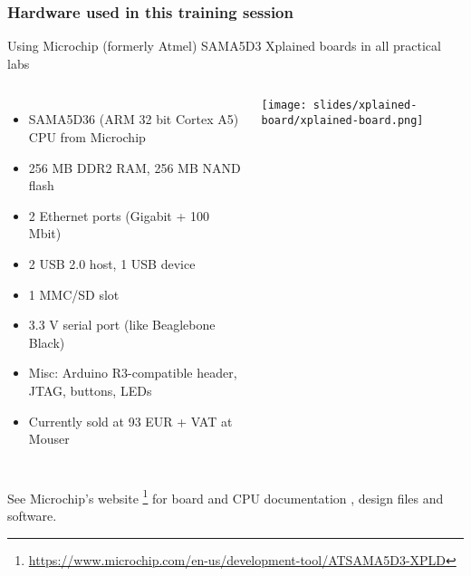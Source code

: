 \begin{frame}
\frametitle{Hardware used in this training session}
  Using Microchip (formerly Atmel) SAMA5D3 Xplained boards in all practical labs
  \begin{columns}
    {\footnotesize
    \begin{itemize}
	\item SAMA5D36 (ARM 32 bit Cortex A5) CPU from Microchip
	\item 256 MB DDR2 RAM, 256 MB NAND flash
	\item 2 Ethernet ports (Gigabit + 100 Mbit)
	\item 2 USB 2.0 host, 1 USB device
	\item 1 MMC/SD slot
	\item 3.3 V serial port (like Beaglebone Black)
	\item Misc: Arduino R3-compatible header, JTAG, buttons, LEDs
	\item Currently sold at 93 EUR + VAT at Mouser
    \end{itemize}
    }
    \texttt{[image: slides/xplained-board/xplained-board.png]}
  \end{columns}
  \vspace{1em}
  {\small
  See Microchip's website
  \footnote{\tiny \url{https://www.microchip.com/en-us/development-tool/ATSAMA5D3-XPLD}}
  for board and CPU documentation , design files and software.
  }
\end{frame}
